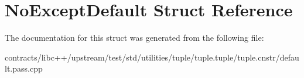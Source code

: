 \hypertarget{struct_no_except_default}{}\section{No\+Except\+Default Struct Reference}
\label{struct_no_except_default}


The documentation for this struct was generated from the following file\+:\begin{DoxyCompactItemize}
\item 
contracts/libc++/upstream/test/std/utilities/tuple/tuple.\+tuple/tuple.\+cnstr/default.\+pass.\+cpp\end{DoxyCompactItemize}
